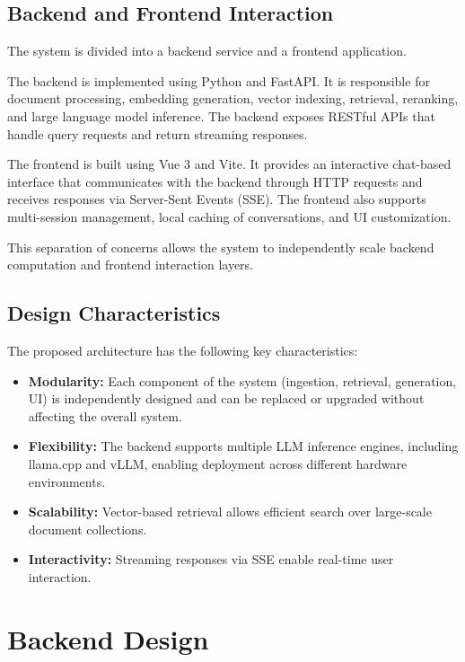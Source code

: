 \section{Backend and Frontend Interaction}

The system is divided into a backend service and a frontend application.

The backend is implemented using Python and FastAPI. It is responsible for document processing, embedding generation, vector indexing, retrieval, reranking, and large language model inference. The backend exposes RESTful APIs that handle query requests and return streaming responses.

The frontend is built using Vue 3 and Vite. It provides an interactive chat-based interface that communicates with the backend through HTTP requests and receives responses via Server-Sent Events (SSE). The frontend also supports multi-session management, local caching of conversations, and UI customization.

This separation of concerns allows the system to independently scale backend computation and frontend interaction layers.

\section{Design Characteristics}

The proposed architecture has the following key characteristics:

\begin{itemize}
    \item \textbf{Modularity:} Each component of the system (ingestion, retrieval, generation, UI) is independently designed and can be replaced or upgraded without affecting the overall system.

    \item \textbf{Flexibility:} The backend supports multiple LLM inference engines, including llama.cpp and vLLM, enabling deployment across different hardware environments.

    \item \textbf{Scalability:} Vector-based retrieval allows efficient search over large-scale document collections.

    \item \textbf{Interactivity:} Streaming responses via SSE enable real-time user interaction.
\end{itemize}
\chapter{Backend Design}
